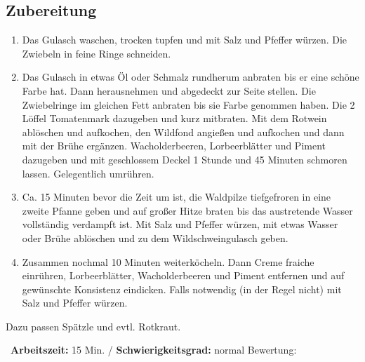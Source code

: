 \begin{minipage}[t]{0.58\textwidth}
\vspace{0pt}
\subsection*{Zubereitung}
\begin{enumerate}[leftmargin=*, itemindent=14pt]
\item Das Gulasch waschen, trocken tupfen und mit Salz und Pfeffer würzen. Die Zwiebeln in feine Ringe schneiden.

\item Das Gulasch in etwas Öl oder Schmalz rundherum anbraten bis er eine schöne Farbe hat. Dann herausnehmen und abgedeckt zur Seite stellen. Die Zwiebelringe im gleichen Fett anbraten bis sie Farbe genommen haben. Die 2 Löffel Tomatenmark dazugeben und kurz mitbraten. Mit dem Rotwein ablöschen und aufkochen, den Wildfond angießen und aufkochen und dann mit der Brühe ergänzen. Wacholderbeeren, Lorbeerblätter und Piment dazugeben und mit geschlossem Deckel 1 Stunde und 45 Minuten schmoren lassen. Gelegentlich umrühren.

\item Ca. 15 Minuten bevor die Zeit um ist, die Waldpilze tiefgefroren in eine zweite Pfanne geben und auf großer Hitze braten bis das austretende Wasser vollständig verdampft ist. Mit Salz und Pfeffer würzen, mit etwas Wasser oder Brühe ablöschen und zu dem Wildschweingulasch geben.

\item Zusammen nochmal 10 Minuten weiterköcheln. Dann Creme fraiche einrühren, Lorbeerblätter, Wacholderbeeren und Piment entfernen und auf gewünschte Konsistenz eindicken. Falls notwendig (in der Regel nicht) mit Salz und Pfeffer würzen.

\end{enumerate}
Dazu passen Spätzle und evtl. Rotkraut.
\end{minipage}
\vfill
\decothreeright \, \textbf{Arbeitszeit:} 15 Min. / \textbf{Schwierigkeitsgrad:} normal \decothreeleft \hfill Bewertung:  \CIRCLE \CIRCLE \CIRCLE \CIRCLE \CIRCLE